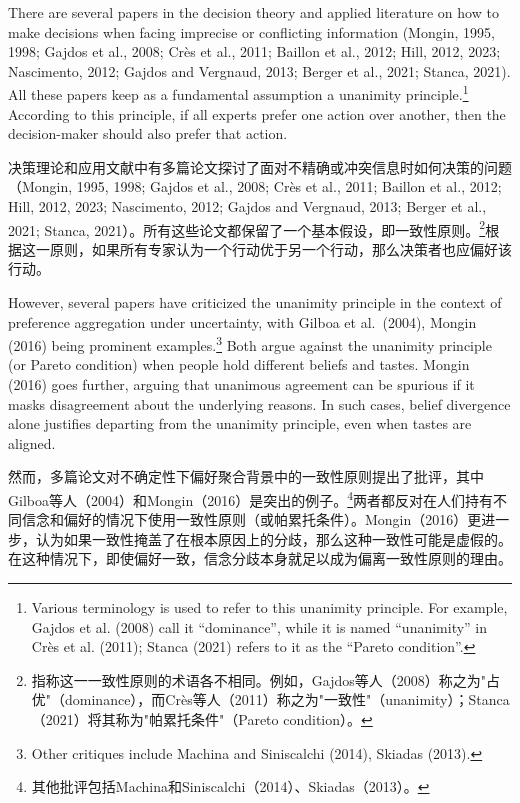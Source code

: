 \documentclass[12pt,a4paper]{article}
\newenvironment{original}
  {\par\noindent\ignorespaces}
  {\par}
\newenvironment{translation}
  {\par\noindent{\color{transblue}\ignorespaces}}
  {\par\medskip}
\begin{document}
\begin{original}
There are several papers in the decision theory and applied literature on how to make decisions when facing imprecise or conflicting information (Mongin, 1995, 1998; Gajdos et al., 2008; Cr\`{e}s et al., 2011; Baillon et al., 2012; Hill, 2012, 2023; Nascimento, 2012; Gajdos and Vergnaud, 2013; Berger et al., 2021; Stanca, 2021). All these papers keep as a fundamental assumption a unanimity principle.\footnote{Various terminology is used to refer to this unanimity principle. For example, Gajdos et al. (2008) call it ``dominance'', while it is named ``unanimity'' in Cr\`{e}s et al. (2011); Stanca (2021) refers to it as the ``Pareto condition''.} According to this principle, if all experts prefer one action over another, then the decision-maker should also prefer that action.
\end{original}

\begin{translation}
决策理论和应用文献中有多篇论文探讨了面对不精确或冲突信息时如何决策的问题（Mongin, 1995, 1998; Gajdos et al., 2008; Cr\`{e}s et al., 2011; Baillon et al., 2012; Hill, 2012, 2023; Nascimento, 2012; Gajdos and Vergnaud, 2013; Berger et al., 2021; Stanca, 2021）。所有这些论文都保留了一个基本假设，即一致性原则。\footnote{指称这一一致性原则的术语各不相同。例如，Gajdos等人（2008）称之为"占优"（dominance），而Crès等人（2011）称之为"一致性"（unanimity）；Stanca（2021）将其称为"帕累托条件"（Pareto condition）。}根据这一原则，如果所有专家认为一个行动优于另一个行动，那么决策者也应偏好该行动。
\end{translation}

\begin{original}
However, several papers have criticized the unanimity principle in the context of preference aggregation under uncertainty, with Gilboa et al.\ (2004), Mongin (2016) being prominent examples.\footnote{Other critiques include Machina and Siniscalchi (2014), Skiadas (2013).} Both argue against the unanimity principle (or Pareto condition) when people hold different beliefs and tastes. Mongin (2016) goes further, arguing that unanimous agreement can be spurious if it masks disagreement about the underlying reasons. In such cases, belief divergence alone justifies departing from the unanimity principle, even when tastes are aligned.
\end{original}

\begin{translation}
然而，多篇论文对不确定性下偏好聚合背景中的一致性原则提出了批评，其中Gilboa等人（2004）和Mongin（2016）是突出的例子。\footnote{其他批评包括Machina和Siniscalchi（2014）、Skiadas（2013）。}两者都反对在人们持有不同信念和偏好的情况下使用一致性原则（或帕累托条件）。Mongin（2016）更进一步，认为如果一致性掩盖了在根本原因上的分歧，那么这种一致性可能是虚假的。在这种情况下，即使偏好一致，信念分歧本身就足以成为偏离一致性原则的理由。
\end{translation}
\end{document}
